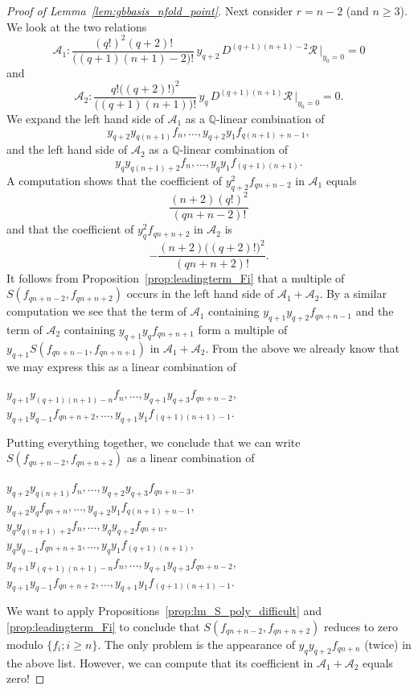 \begin{proof}[Proof of Lemma~\ref{lem:gbbasis_nfold_point}]
Next consider $r=n-2$ (and $n\geq 3$). We look at the two relations
\[ \mathcal{A}_1 : \frac{(q!)^2 (q+2)!}{\bigl((q+1)(n+1) - 2\bigr)!} \, y_{q+2} \, D^{(q+1)(n+1) - 2} \mathcal{R} \, \bigr|_{y_0=0} = 0 \]
and
\[ \mathcal{A}_2 : \frac{ q! \bigl((q+2)!\bigr)^2 }{\bigl((q+1)(n+1)\bigr)!} \,  y_{q} \,  D^{(q+1)(n+1)}\mathcal{R}\, \bigr|_{y_0=0} = 0.    \]
We expand the left hand side of $\mathcal{A}_1$ as a $\mathbb{Q}$-linear combination of
\[ y_{q+2} y_{q(n+1) } f_n , \ldots , y_{q+2} y_{1} f_{q (n+1)+ n-1 },  \]
and the left hand side of $\mathcal{A}_2$ as a $\mathbb{Q}$-linear combination of
\[ y_{q} y_{q(n+1) + 2 } f_n , \ldots , y_{q} y_{1} f_{(q+1)(n+1)  }.  \]
A computation shows that the coefficient of $y_{q+2}^2f_{qn+n-2}$ in $\mathcal{A}_1$ equals
\[   \frac{(n+2) (q!)^2 }{( qn + n - 2)!} \]
and that the coefficient of $y_{q}^2f_{qn+n+2}$ in $\mathcal{A}_2$ is
\[   - \frac{ (n+2) \bigl((q+2)!\bigr)^2 }{( qn + n + 2)!}.    \] 
It follows from Proposition~\ref{prop:leadingterm_Fi} that a multiple of $S(f_{qn+n-2},f_{qn+n+2})$ occurs in the left hand side of $\mathcal{A}_1 + \mathcal{A}_2$. By a similar computation we see that the term of $\mathcal{A}_1$ containing $y_{q+1}y_{q+2}f_{qn+n-1}$ and the term of $\mathcal{A}_2$ containing $y_{q+1}y_{q}f_{qn+n+1}$ form a multiple of $y_{q+1}S(f_{qn+n-1},f_{qn+n+1})$ in $\mathcal{A}_1 + \mathcal{A}_2$. From the above we already know that we may express this as a linear combination of
\begin{center}
$ y_{q+1}y_{(q+1)(n+1) - n } f_{n} , \ldots, y_{q+1}y_{q+3}f_{qn+n-2} ,$\\
$ y_{q+1}y_{q-1}f_{qn+n+2} , \ldots , y_{q+1}y_{1} f_{(q+1)(n+1) - 1}.$   
\end{center}
Putting everything together, we conclude that we can write $S(f_{qn+n-2},f_{qn+n+2})$ as a linear combination of
\begin{center}
 $y_{q+2} y_{q(n+1) } f_n , \ldots , y_{q+2}y_{q+3}f_{qn+n-3},$\\
 $y_{q+2}y_{q}f_{qn+n},  \ldots, y_{q+2} y_{1} f_{q (n+1) + n-1 }, $\\
 $y_{q} y_{q(n+1) + 2 } f_n , \ldots , y_q y_{q+2} f_{qn+n} ,$ \\
 $y_q y_{q-1} f_{qn+n+3}  , \ldots, y_{q} y_{1} f_{(q+1)(n+1)}, $ \\
 $y_{q+1}y_{(q+1)(n+1) - n } f_{n} , \ldots, y_{q+1}y_{q+3}f_{qn+n-2} ,$\\
 $y_{q+1}y_{q-1}f_{qn+n+2} , \ldots , y_{q+1}y_{1} f_{(q+1)(n+1) - 1}.$   
\end{center}
We want to apply Propositions~\ref{prop:lm_S_poly_difficult} and \ref{prop:leadingterm_Fi} to conclude that $S(f_{qn+n-2},f_{qn+n+2})$ reduces to zero modulo $\{f_i;i\geq n\}$. The only problem is the appearance of $y_q y_{q+2} f_{qn+n}$ (twice) in the above list. However, we can compute that its coefficient in $\mathcal{A}_1 + \mathcal{A}_2$ equals zero!


\end{proof}
